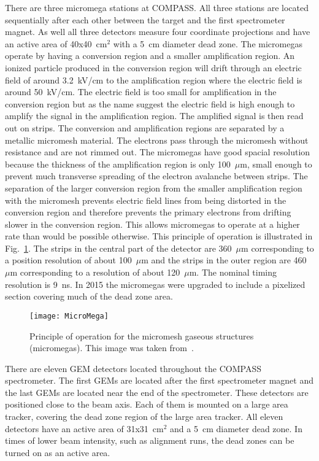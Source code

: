 There are three micromega stations at COMPASS.  All three stations are located
sequentially after each other between the target and the first spectrometer
magnet.  As well all three detectors measure four coordinate projections and
have an active area of 40x40~cm$^2$ with a 5~cm diameter dead zone.  The
micromegas operate by having a conversion region and a smaller amplification
region.  An ionized particle produced in the conversion region will drift
through an electric field of around 3.2~kV/cm to the amplification region where
the electric field is around 50~kV/cm.  The electric field is too small for
amplification in the conversion region but as the name suggest the electric
field is high enough to amplify the signal in the amplification region.  The
amplified signal is then read out on strips.  The conversion and amplification
regions are separated by a metallic micromesh material.  The electrons pass
through the micromesh without resistance and are not rimmed out.  The micromegas
have good spacial resolution because the thickness of the amplification region
is only 100~$\mu$m, small enough to prevent much transverse spreading of the
electron avalanche between strips.  The separation of the larger conversion
region from the smaller amplification region with the micromesh prevents
electric field lines from being distorted in the conversion region and therefore
prevents the primary electrons from drifting slower in the conversion region.
This allows micromegas to operate at a higher rate than would be possible
otherwise.  This principle of operation is illustrated in
Fig.~\ref{fig::MicroMega}.  The strips in the central part of the detector are
360~$\mu$m corresponding to a position resolution of about 100~$\mu$m and the
strips in the outer region are 460~$\mu$m corresponding to a resolution of about
120~$\mu$m.  The nominal timing resolution is 9~ns.  In 2015 the micromegas were
upgraded to include a pixelized section covering much of the dead zone
area. \par

\begin{figure}[h!t]
  \centering
  \texttt{[image: MicroMega]}
  \caption{Principle of operation for the micromesh gaseous structures
    (micromegas).  This image was taken from~\cite{compassSpec}.}
  \label{fig::MicroMega}
\end{figure}

There are eleven GEM detectors located throughout the COMPASS spectrometer.  The
first GEMs are located after the first spectrometer magnet and the last GEMs are
located near the end of the spectrometer.  These detectors are positioned close
to the beam axis.  Each of them is mounted on a large area tracker, covering the
dead zone region of the large area tracker.  All eleven detectors have an active
area of 31x31~cm$^2$ and a 5~cm diameter dead zone.  In times of lower beam
intensity, such as alignment runs, the dead zones can be turned on as an active
area.  \par

